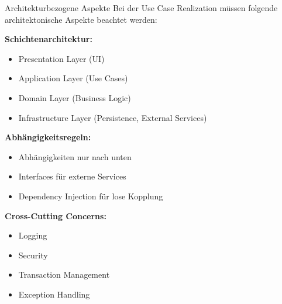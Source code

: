 \begin{concept}{Architekturbezogene Aspekte}
Bei der Use Case Realization müssen folgende architektonische Aspekte beachtet werden:

\textbf{Schichtenarchitektur:}
\begin{itemize}
    \item Presentation Layer (UI)
    \item Application Layer (Use Cases)
    \item Domain Layer (Business Logic)
    \item Infrastructure Layer (Persistence, External Services)
\end{itemize}

\textbf{Abhängigkeitsregeln:}
\begin{itemize}
    \item Abhängigkeiten nur nach unten
    \item Interfaces für externe Services
    \item Dependency Injection für lose Kopplung
\end{itemize}

\textbf{Cross-Cutting Concerns:}
\begin{itemize}
    \item Logging
    \item Security
    \item Transaction Management
    \item Exception Handling
\end{itemize}
\end{concept}



